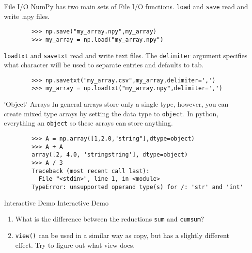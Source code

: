 \documentclass[serif,xcolor=pdftex,dvipsnames,table,hyperref={bookmarks=false,breaklinks}]{beamer}
\begin{document}
\begin{frame}[t,fragile]{File I/O}
	NumPy has two main sets of File I/O functions. \verb|load| and \verb|save| read and write .npy files.
	
	\pause
	\begin{lstlisting}
		>>> np.save("my_array.npy",my_array)
		>>> my_array = np.load("my_array.npy")
	\end{lstlisting}
	
	\pause
	\verb|loadtxt| and \verb|savetxt| read and write text files. The \verb|delimiter| argument specifies what character will be used to separate entries and defaults to tab.
	
	\pause
	\begin{lstlisting}
		>>> np.savetxt("my_array.csv",my_array,delimiter=',')
		>>> my_array = np.loadtxt("my_array.npy",delimiter=',')
	\end{lstlisting}
\end{frame}

\begin{frame}[t,fragile]{'Object' Arrays}
	In general arrays store only a single type, however, you can create mixed type arrays by setting the data type to \verb|object|. In python, everything an \verb|object| so these arrays can store anything.
	
	\pause
	\begin{lstlisting}
		>>> A = np.array([1,2.0,"string"],dtype=object)
		>>> A + A
		array([2, 4.0, 'stringstring'], dtype=object)
		>>> A / 3
		Traceback (most recent call last):
		  File "<stdin>", line 1, in <module>
		TypeError: unsupported operand type(s) for /: 'str' and 'int'
	\end{lstlisting}
\end{frame}

\begin{frame}[t,fragile]{Interactive Demo}
	\centering
	\Huge{Interactive Demo}
	\normalsize
	\begin{enumerate}
		\item What is the difference between the reductions \verb|sum| and \verb|cumsum|?
		\item \verb|view()| can be used in a similar way as copy, but has a slightly different effect. Try to figure out what view does.
	\end{enumerate}
\end{frame}
%
%
\end{document}
